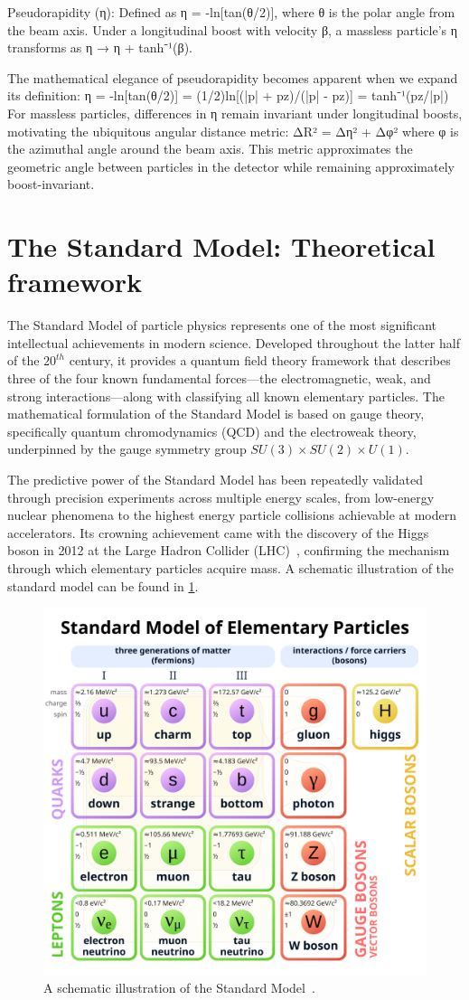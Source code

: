 Pseudorapidity (η): Defined as η = -ln[tan(θ/2)], where θ is the polar angle from the beam axis. Under a longitudinal boost with velocity β, a massless particle's η transforms as η → η + tanh⁻¹(β).

The mathematical elegance of pseudorapidity becomes apparent when we expand its definition:
η = -ln[tan(θ/2)] = (1/2)ln[(|p| + pz)/(|p| - pz)] = tanh⁻¹(pz/|p|)
For massless particles, differences in η remain invariant under longitudinal boosts, motivating the ubiquitous angular distance metric:
ΔR² = Δη² + Δφ²
where φ is the azimuthal angle around the beam axis. This metric approximates the geometric angle between particles in the detector while remaining approximately boost-invariant.

\section{The Standard Model: Theoretical framework}
The Standard Model of particle physics represents one of the most significant intellectual achievements in modern science.
%
Developed throughout the latter half of the $20^{th}$ century, it provides a quantum field theory framework that describes three of the four known fundamental forces—the electromagnetic, weak, and strong interactions---along with classifying all known elementary particles.
%
The mathematical formulation of the Standard Model is based on gauge theory, specifically quantum chromodynamics (QCD) and the electroweak theory, underpinned by the gauge symmetry group \(SU(3)\times SU(2)\times U(1)\).

The predictive power of the Standard Model has been repeatedly validated through precision experiments across multiple energy scales, from low-energy nuclear phenomena to the highest energy particle collisions achievable at modern accelerators.
%
Its crowning achievement came with the discovery of the Higgs boson in 2012 at the Large Hadron Collider (LHC)~\cite{ATLAS:2012yve, collaboration_observation_2012}, confirming the mechanism through which elementary particles acquire mass.
%
A schematic illustration of the standard model can be found in \cref{fig:sm}.

\begin{figure}
    \centering
    \includegraphics[width=0.5\linewidth]{figures/chapter-01/Standard_Model_of_Elementary_Particles.svg.png}
    \caption{
        A schematic illustration of the Standard Model~\cite{wiki:stdmodel}.
    }
    \label{fig:sm}
\end{figure}
